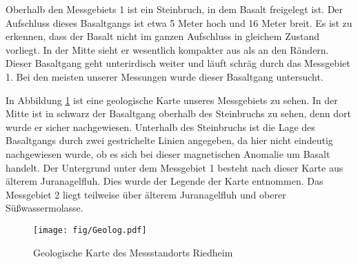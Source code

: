 Oberhalb den Messgebiets 1 ist ein Steinbruch, in dem Basalt freigelegt ist. Der Aufschluss dieses Basaltgangs ist etwa 5 Meter hoch und 16 Meter breit. 
Es ist zu erkennen, dass der Basalt nicht im ganzen Aufschluss in gleichem Zustand vorliegt. In der Mitte sieht er wesentlich kompakter aus als an den Rändern.
Dieser Basaltgang geht unterirdisch weiter und läuft schräg durch das Messgebiet 1. Bei den meisten unserer Messungen wurde dieser Basaltgang untersucht.

In Abbildung \ref{abb:Geolog} ist eine geologische Karte unseres Messgebiets zu sehen. In der Mitte ist in schwarz der Basaltgang oberhalb des Steinbruchs zu sehen, denn dort wurde er sicher nachgewiesen.
Unterhalb des Steinbruchs ist die Lage des Basaltgangs durch zwei gestrichelte Linien angegeben, da hier nicht eindeutig nachgewiesen wurde, ob es sich bei dieser magnetischen Anomalie um Basalt handelt. Der Untergrund unter dem Messgebiet 1 besteht nach dieser Karte aus älterem Juranagelfluh. Dies wurde der Legende der Karte entnommen. Das Messgebiet 2 liegt teilweise über älterem Juranagelfluh und oberer Süßwassermolasse.

\begin{figure}[ht]
 \centering
 \texttt{[image: fig/Geolog.pdf]}
 \caption[Geologische Karte]{Geologische Karte des Messstandorts Riedheim}
 \label{abb:Geolog}
\end{figure}